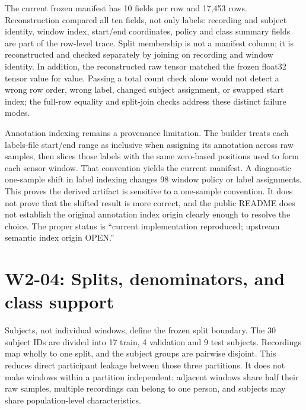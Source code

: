 \documentclass[11pt,a4paper]{article}
\begin{document}
The current frozen manifest has 10 fields per row and 17,453 rows. Reconstruction compared all ten fields, not only labels: recording and subject identity, window index, start/end coordinates, policy and class summary fields are part of the row-level trace. Split membership is not a manifest column; it is reconstructed and checked separately by joining on recording and window identity. In addition, the reconstructed raw tensor matched the frozen float32 tensor value for value. Passing a total count check alone would not detect a wrong row order, wrong label, changed subject assignment, or swapped start index; the full-row equality and split-join checks address these distinct failure modes.

Annotation indexing remains a provenance limitation. The builder treats each labels-file start/end range as inclusive when assigning its annotation across raw samples, then slices those labels with the same zero-based positions used to form each sensor window. That convention yields the current manifest. A diagnostic one-sample shift in label indexing changes 98 window policy or label assignments. This proves the derived artifact is sensitive to a one-sample convention. It does not prove that the shifted result is more correct, and the public README does not establish the original annotation index origin clearly enough to resolve the choice. The proper status is “current implementation reproduced; upstream semantic index origin OPEN.”

\section{W2-04: Splits, denominators, and class support}
Subjects, not individual windows, define the frozen split boundary. The 30 subject IDs are divided into 17 train, 4 validation and 9 test subjects. Recordings map wholly to one split, and the subject groups are pairwise disjoint. This reduces direct participant leakage between those three partitions. It does not make windows within a partition independent: adjacent windows share half their raw samples, multiple recordings can belong to one person, and subjects may share population-level characteristics.
\end{document}
